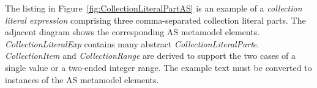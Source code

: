 \documentclass{llncs}
\begin{document}






The listing in Figure~\ref{fig:CollectionLiteralPartAS} is an example of a \textit{collection literal expression} comprising three comma-separated collection literal parts. The adjacent diagram shows the corresponding AS metamodel elements. \emph{CollectionLiteralExp} contains many abstract \emph{CollectionLiteralPart}s. \emph{CollectionItem} and \emph{CollectionRange} are derived to support the two cases of a single value or a two-ended integer range. The example text must be converted to instances of the AS metamodel elements.
\end{document}
